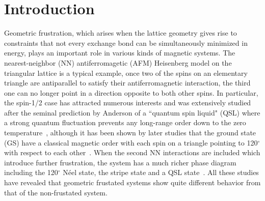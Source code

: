 \documentclass[aps,prb,reprint,amsfonts,amsmath,amssymb,showpacs,groupedaddress,superscriptaddress]{revtex4-1}
\begin{document}
\maketitle

\section{\label{sec:Introduction}Introduction}

Geometric frustration, which arises when the lattice geometry gives rise to constraints that not every exchange bond can be simultaneously minimized in energy, plays an important role in various kinds of magnetic systems. The nearest-neighbor (NN) antiferromagetic (AFM) Heisenberg model on the triangular lattice is a typical example, once two of the spins on an elementary triangle are antiparallel to satisfy their antiferromagnetic interaction, the third one can no longer point in a direction opposite to both other spins. In particular, the spin-1/2 case has attracted numerous interests and was extensively studied after the seminal prediction by Anderson of a ``quantum spin liquid" (QSL) where a strong quantum fluctuation prevents any long-range order down to the zero temperature~\cite{Anderson1973}, although it has been shown by later studies that the ground state (GS) have a classical magnetic order with each spin on a triangle pointing to 120$^\circ$ with respect to each other~\cite{PhysRevLett.99.127004,PhysRevLett.82.3899,PhysRevB.50.10048,PhysRevLett.60.2531}. When the second NN interactions are included which introduce further frustration, the system has a much richer phase diagram including the 120$^\circ$ N\'{e}el state, the stripe state and a QSL state~\cite{PhysRevB.91.014426,PhysRevB.92.041105,PhysRevB.92.140403,PhysRevB.96.165141,PhysRevB.93.144411,JPSJ.83.093707,PhysRevB.94.121111,PhysRevB.96.075116,PhysRevLett.120.207203,PhysRevLett.123.207203}. All these studies have revealed that geometric frustated systems show quite different behavior from that of the non-frustated system.
\end{document}
